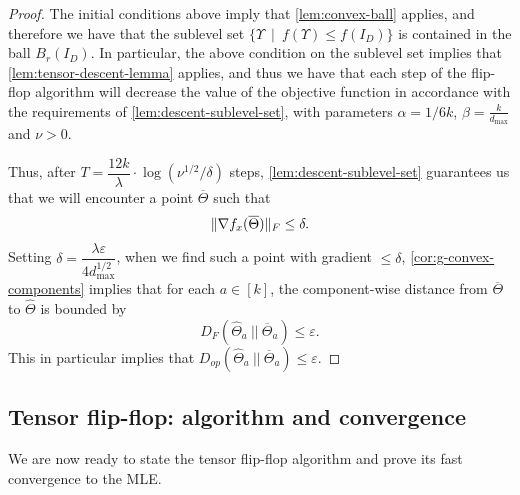 \documentclass[aos]{imsart}
\theoremstyle{definition}
\numberwithin{equation}{section}
\DeclarePairedDelimiter{\norm}{\lVert}{\rVert}
\newcommand{\otheta}{\overline{\Theta}}
\newcommand{\htheta}{\widehat{\Theta}}
\newcommand{\eps}{\varepsilon}
\def\dmax{d_{\max}}
\begin{document}
\begin{proof}
	The initial conditions above imply that \cref{lem:convex-ball} applies, and therefore we have that the sublevel set $\{ \Upsilon \ \mid \ f(\Upsilon) \leq f(I_D)  \}$ is contained in the ball $B_r(I_D)$. In particular, the above condition on the sublevel set implies that \cref{lem:tensor-descent-lemma} applies, and thus we have that each step of the flip-flop algorithm will decrease the value of the objective function in accordance with the requirements of \cref{lem:descent-sublevel-set}, with parameters $\alpha = 1/6k$, $\beta = \frac{k}{\dmax}$ and $\nu > 0$. 
	
	Thus, after $T = \dfrac{12k}{\lambda} \cdot \log(\nu^{1/2}/\delta)$ steps, \cref{lem:descent-sublevel-set} guarantees us that we will encounter a point $\otheta$ such that
	$$ \norm{\nabla f_x(\otheta)}_F \leq \delta.$$
	Setting $\delta = \dfrac{\lambda \eps}{4 \dmax^{1/2}}$, when we find such a point with gradient $\leq \delta$, \cref{cor:g-convex-components} implies that for each $a \in [k]$, the component-wise distance from $\otheta$ to $\htheta$ is bounded by
	$$ D_F(\htheta_a \ || \ \otheta_a) \leq \eps. $$
	This in particular implies that $D_{op}(\htheta_a \ || \ \otheta_a) \leq \eps.$
\end{proof}

\newpage 
\subsection{Tensor flip-flop: algorithm and convergence}

We are now ready to state the tensor flip-flop algorithm and prove its fast convergence to the MLE.
\end{document}
